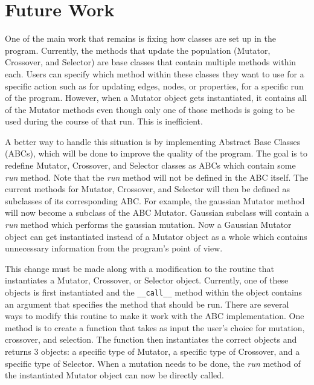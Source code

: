 \documentclass{article}
\begin{document}
\section{Future Work}
One of the main work that remains is fixing how classes are set up in the program.
Currently, the methods that update the population (Mutator, Crossover, and
Selector) are base classes that contain multiple methods within each. Users
can specify which method within these classes they want to use for a specific
action such as for updating edges, nodes, or properties, for a specific run
of the program. However, when a Mutator object gets instantiated, it contains
all of the Mutator methods even though only one of those methods is going to be
used during the course of that run. This is inefficient.

A better way to handle this situation is by implementing Abstract Base Classes
(ABCs), which will be done to improve the quality of the program. The goal is
to redefine Mutator, Crossover, and Selector classes as ABCs which contain
some \textit{run} method. Note that the \textit{run} method will not be defined in the ABC
itself. The current methods for Mutator, Crossover, and Selector will then
be defined as subclasses of its corresponding ABC. For example, the gaussian
Mutator method will now become a subclass of the ABC Mutator. Gaussian
subclass will contain a \textit{run} method which performs the gaussian mutation. Now
a Gaussian Mutator object can get instantiated instead of a Mutator object as
a whole which contains unnecessary information from the program's point of
view.

This change must be made along with a modification to the routine that
instantiates a Mutator, Crossover, or Selector object. Currently, one of
these objects is first instantiated and the \texttt{\_\_call\_\_} method within the object
contains an argument that specifies the method that should be run. There are
several ways to modify this routine to make it work with the ABC implementation.
One method is to create a function that takes as input the user's choice for
mutation, crossover, and selection. The function then instantiates the correct
objects and returns 3 objects: a specific type of Mutator, a specific type
of Crossover, and a specific type of Selector. When a mutation needs to be done,
the \textit{run} method of the instantiated Mutator object can now be directly called.
\end{document}
